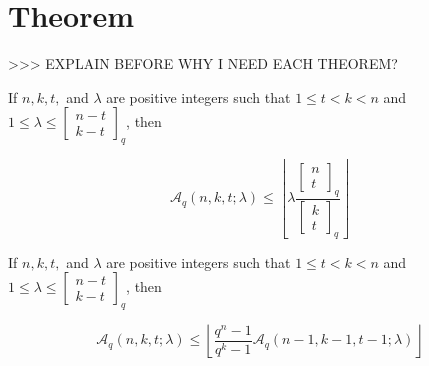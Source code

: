 \section{Theorem}

>\textcompwordmark >\textcompwordmark > EXPLAIN BEFORE WHY I NEED
EACH THEOREM?
\begin{thm}
 If $n,k,t,$ and $\lambda$ are positive integers such that $1\leq t<k<n$
and $1\leq\lambda\leq\left[\begin{array}{c}
n-t\\
k-t
\end{array}\right]_{q}$, then

\[
\mathcal{A}_{q}\left(n,k,t;\lambda\right)\leq\left\lfloor \lambda\frac{\left[\begin{array}{c}
n\\
t
\end{array}\right]_{q}}{\left[\begin{array}{c}
k\\
t
\end{array}\right]_{q}}\right\rfloor 
\]
\end{thm}
%
\begin{thm}
 If $n,k,t,$ and $\lambda$ are positive integers such that $1\leq t<k<n$
and $1\leq\lambda\leq\left[\begin{array}{c}
n-t\\
k-t
\end{array}\right]_{q}$, then

\[
\mathcal{A}_{q}\left(n,k,t;\lambda\right)\leq\left\lfloor \frac{q^{n}-1}{q^{k}-1}\mathcal{A}_{q}\left(n-1,k-1,t-1;\lambda\right)\right\rfloor 
\]
\end{thm}

\clearpage